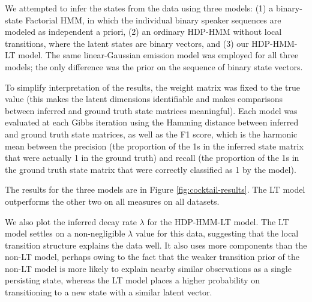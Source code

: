 We attempted to infer the states
from the data using three models: (1) a binary-state Factorial HMM, in which the
individual binary speaker sequences are modeled as independent a
priori, (2) an ordinary HDP-HMM without local transitions, where the
latent states are binary vectors, and (3) our
HDP-HMM-LT model.  The same linear-Gaussian emission model was employed for all three models; the only difference was the prior on the sequence of binary state vectors.

To simplify interpretation of the results, the weight matrix
was fixed to the true value (this makes the latent dimensions
identifiable and makes comparisons between inferred and ground truth
state matrices meaningful).  Each model was evaluated at each Gibbs
iteration using the Hamming distance between inferred 
and ground truth state matrices, as well as the F1 score, which is the harmonic mean between the precision (the proportion of the 1s in the inferred state matrix that were actually 1 in the ground truth) and recall (the proportion of the 1s in the ground truth state matrix that were correctly classified as 1 by the model).

The results for the three models are in Figure
\ref{fig:cocktail-results}.  %
The LT model outperforms the other two on
all measures on all datasets. 

We also plot the inferred decay rate $\lambda$ for the
HDP-HMM-LT model.  The LT model settles on a non-negligible $\lambda$
value for this data, suggesting that the local transition structure
explains the data well.  It also uses more components than the non-LT
model, perhaps owing to the fact that the weaker transition prior of
the non-LT model is more likely to explain nearby similar observations
as a single persisting state, whereas the LT model places a higher
probability on transitioning to a new state with a similar latent vector.


